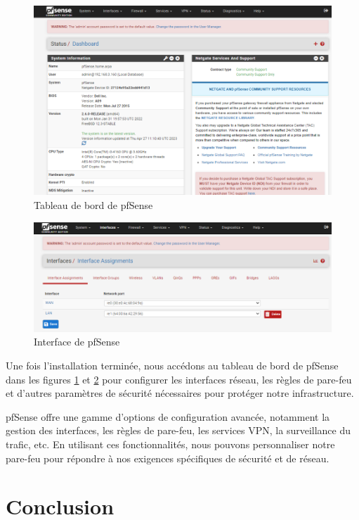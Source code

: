 \begin{figure}[H]
\centering
\includegraphics[width=15cm]{Images/BRadesMelian-Topologie14.png}
\caption{Tableau de bord de pfSense}
\label{Chap3.3.9}
\end{figure}

\begin{figure}[H]
\centering
\includegraphics[width=15cm]{Images/BRadesMelian-Topologie15.png}
\caption{Interface de pfSense}
\label{Chap3.3.10}
\end{figure}

Une fois l'installation terminée, nous accédons au tableau de bord de pfSense dans les figures \ref{Chap3.3.9} et \ref{Chap3.3.10} pour configurer les interfaces réseau, les règles de pare-feu et d'autres paramètres de sécurité nécessaires pour protéger notre infrastructure.

pfSense offre une gamme d'options de configuration avancée, notamment la gestion des interfaces, les règles de pare-feu, les services VPN, la surveillance du trafic, etc. En utilisant ces fonctionnalités, nous pouvons personnaliser notre pare-feu pour répondre à nos exigences spécifiques de sécurité et de réseau.

\section{Conclusion}

